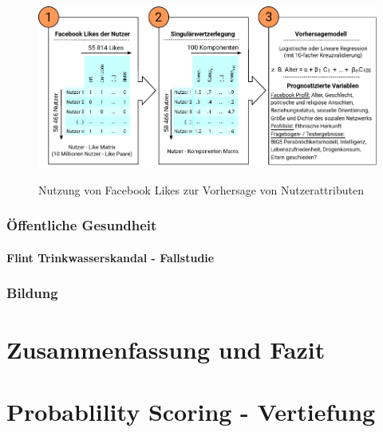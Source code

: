 \documentclass[12pt,a4paper,listof=totoc,oneside]{scrreprt}
\begin{document}
\begin{figure}%
\centering
\caption{Nutzung von Facebook Likes zur Vorhersage von Nutzerattributen}
\includegraphics[scale=1.0]{Grafiken/Facebook_Likes_Ink.pdf} 
\label{pic:Like_Matrix}
\end{figure}

\subsection{Öffentliche Gesundheit}

\subsubsection{Flint Trinkwasserskandal - Fallstudie}

\subsection{Bildung}


\chapter{Zusammenfassung und Fazit}

\appendix
\chapter{Probablility Scoring - Vertiefung}
\end{document}
